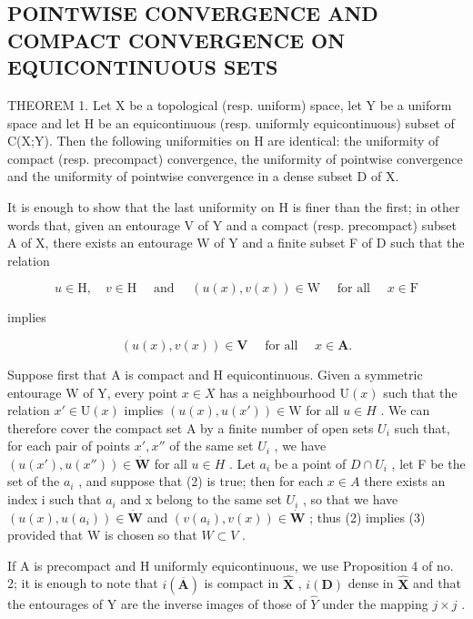 \subsection{POINTWISE CONVERGENCE AND COMPACT CONVERGENCE ON EQUICONTINUOUS SETS}

THEOREM 1. Let X be a topological (resp. uniform) space, let Y be a uniform space and let H be an equicontinuous (resp. uniformly equicontinuous) subset of C(X;Y). Then the following uniformities on H are identical: the uniformity of compact (resp. precompact) convergence, the uniformity of pointwise convergence and the uniformity of pointwise convergence in a dense subset D of X.

It is enough to show that the last uniformity on H is finer than the first; in other words that, given an entourage V of Y and a compact (resp. precompact) subset A of X, there exists an entourage W of Y and a finite subset F of D such that the relation

\[
u \in \mathrm{H}, \quad v \in \mathrm{H} \quad \text { and } \quad (u (x), v (x)) \in \mathrm{W} \quad \text { for   all } \quad x \in \mathrm{F}\tag{2}
\]

implies

\[
(u (x), v (x)) \in \mathbf {V} \quad \text { for   all } \quad x \in \mathbf {A}.\tag{3}
\]

Suppose first that A is compact and H equicontinuous. Given a symmetric entourage W of Y, every point \(x \in X\) has a neighbourhood \(\mathrm{U}(x)\) such that the relation \(x' \in \mathrm{U}(x)\) implies \((u(x), u(x')) \in \mathrm{W}\) for all \(u \in H\) . We can therefore cover the compact set A by a finite number of open sets \(U_i\) such that, for each pair of points \(x', x''\) of the same set \(U_i\) , we have \((u(x'), u(x'')) \in \dot{\mathbf{W}}\) for all \(u \in H\) . Let \(a_i\) be a point of \(D \cap U_i\) , let F be the set of the \(a_i\) , and suppose that (2) is true; then for each \(x \in A\) there exists an index i such that \(a_i\) and x belong to the same set \(U_i\) , so that we have \((u(x), u(a_i)) \in \dot{\mathbf{W}}\) and \((v(a_i), v(x)) \in \dot{\mathbf{W}}\) ; thus (2) implies (3) provided that W is chosen so that \(W \subset V\) .

If A is precompact and H uniformly equicontinuous, we use Proposition 4 of no. 2; it is enough to note that \(i(\overline{\mathbf{A}})\) is compact in \(\hat{\mathbf{X}}\) , \(i(\mathbf{D})\) dense in \(\hat{\mathbf{X}}\) and that the entourages of Y are the inverse images of those of \(\hat{Y}\) under the mapping \(j \times j\) .

